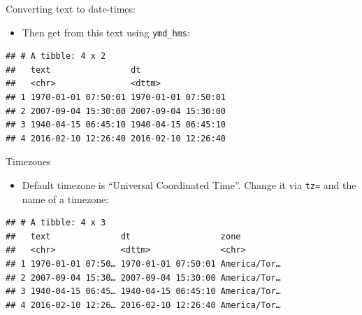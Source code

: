 \documentclass[ignorenonframetext,]{beamer}
\newenvironment{Shaded}{\begin{snugshade}}{\end{snugshade}}
\newcommand{\DataTypeTok}[1]{\textcolor[rgb]{0.13,0.29,0.53}{#1}}
\newcommand{\KeywordTok}[1]{\textcolor[rgb]{0.13,0.29,0.53}{\textbf{#1}}}
\newcommand{\NormalTok}[1]{#1}
\newcommand{\OperatorTok}[1]{\textcolor[rgb]{0.81,0.36,0.00}{\textbf{#1}}}
\newcommand{\StringTok}[1]{\textcolor[rgb]{0.31,0.60,0.02}{#1}}
\providecommand{\tightlist}{%
  \setlength{\itemsep}{0pt}\setlength{\parskip}{0pt}}
\begin{document}
\begin{frame}[fragile]{Converting text to date-times:}
\protect\hypertarget{converting-text-to-date-times}{}

\begin{itemize}
\tightlist
\item
  Then get from this text using \texttt{ymd\_hms}:
\end{itemize}

\begin{Shaded}
\end{Shaded}

\begin{verbatim}
## # A tibble: 4 x 2
##   text                dt                 
##   <chr>               <dttm>             
## 1 1970-01-01 07:50:01 1970-01-01 07:50:01
## 2 2007-09-04 15:30:00 2007-09-04 15:30:00
## 3 1940-04-15 06:45:10 1940-04-15 06:45:10
## 4 2016-02-10 12:26:40 2016-02-10 12:26:40
\end{verbatim}

\end{frame}

\begin{frame}[fragile]{Timezones}
\protect\hypertarget{timezones}{}

\begin{itemize}
\tightlist
\item
  Default timezone is ``Universal Coordinated Time''. Change it via
  \texttt{tz=} and the name of a timezone:
\end{itemize}

\begin{Shaded}
\end{Shaded}

\begin{verbatim}
## # A tibble: 4 x 3
##   text              dt                  zone        
##   <chr>             <dttm>              <chr>       
## 1 1970-01-01 07:50… 1970-01-01 07:50:01 America/Tor…
## 2 2007-09-04 15:30… 2007-09-04 15:30:00 America/Tor…
## 3 1940-04-15 06:45… 1940-04-15 06:45:10 America/Tor…
## 4 2016-02-10 12:26… 2016-02-10 12:26:40 America/Tor…
\end{verbatim}

\end{frame}
\end{document}
